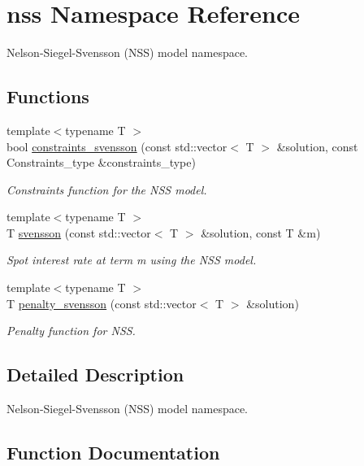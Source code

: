 \hypertarget{namespacenss}{}\section{nss Namespace Reference}
\label{namespacenss}


Nelson-\/\+Siegel-\/\+Svensson (N\+SS) model namespace.  


\subsection*{Functions}
\begin{DoxyCompactItemize}
\item 
{\footnotesize template$<$typename T $>$ }\\bool \hyperlink{namespacenss_a39de3569a71e773f9da82c713eb7e6eb}{constraints\+\_\+svensson} (const std\+::vector$<$ T $>$ \&solution, const Constraints\+\_\+type \&constraints\+\_\+type)
\begin{DoxyCompactList}\small\item\em Constraints function for the N\+SS model. \end{DoxyCompactList}\item 
{\footnotesize template$<$typename T $>$ }\\T \hyperlink{namespacenss_a71aad246261afa16f8bb1a4057570d4b}{svensson} (const std\+::vector$<$ T $>$ \&solution, const T \&m)
\begin{DoxyCompactList}\small\item\em Spot interest rate at term m using the N\+SS model. \end{DoxyCompactList}\item 
{\footnotesize template$<$typename T $>$ }\\T \hyperlink{namespacenss_a009a0ebbca20f7969d0c2ed5a241aa82}{penalty\+\_\+svensson} (const std\+::vector$<$ T $>$ \&solution)
\begin{DoxyCompactList}\small\item\em Penalty function for N\+SS. \end{DoxyCompactList}\end{DoxyCompactItemize}


\subsection{Detailed Description}
Nelson-\/\+Siegel-\/\+Svensson (N\+SS) model namespace. 

\subsection{Function Documentation}
\mbox{\label{namespacenss_a39de3569a71e773f9da82c713eb7e6eb}} 

